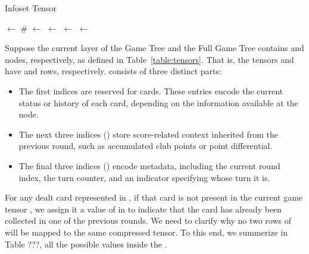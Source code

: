 \begin{algorithm}
\caption{Infoset Tensor}
\label{cs:infosettensor}
\begin{algorithmic}[1]
\State {} $\gets$   \textcolor{green!50!black}{\scriptsize  \# }
\State {}$\gets$
\State {}$\gets$
\State {}$\gets$
\State {}$\gets$
\end{algorithmic}
\end{algorithm}

Suppose the current layer of the Game Tree and the Full Game Tree contains  and  nodes, respectively, as defined in Table~\ref{table:tensors}. That is, the tensors  and  have  and  rows, respectively.  consists of three distinct parts:

\begin{itemize}
    \item The first  indices are reserved for cards. These entries encode the current status or history of each card, depending on the information available at the node.
    \item The next three indices () store score-related context inherited from the previous round, such as accumulated club points or point differential.
    \item The final three indices () encode metadata, including the current round index, the turn counter, and an indicator specifying whose turn it is.
\end{itemize}

For any dealt card represented in , if that card is not present in the current game tensor , we assign it a value of  in  to indicate that the card has already been collected in one of the previous rounds.
We need to clarify why no two rows of  will be mapped to the same compressed tensor. To this end, we summerize in Table ???, all the possible values inside the . 




